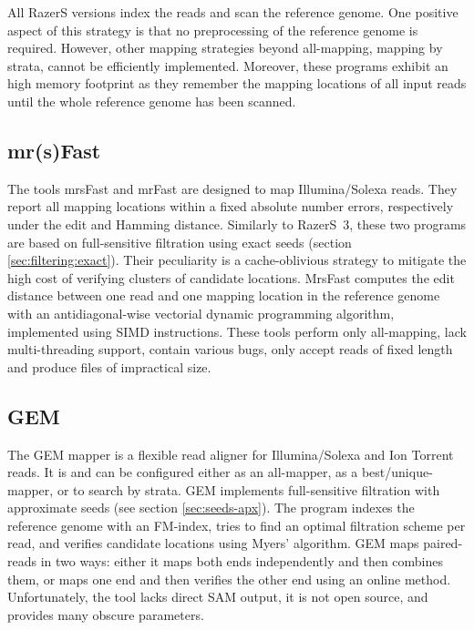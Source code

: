 All RazerS versions index the reads and scan the reference genome.
One positive aspect of this strategy is that no preprocessing of the reference genome is required.
However, other mapping strategies beyond all-mapping, \eg mapping by strata, cannot be efficiently implemented.
Moreover, these programs exhibit an high memory footprint as they remember the mapping locations of all input reads until the whole reference genome has been scanned.


\subsection{mr(s)Fast}
\label{background:mappers:mrsfast}

The tools mrsFast \citep{Hach2010} and mrFast \citep{Ahmadi2012} are designed to map Illumina/Solexa reads.
They report all mapping locations within a fixed absolute number errors, respectively under the edit and Hamming distance.
Similarly to RazerS~3, these two programs are based on full-sensitive filtration using exact seeds (section \ref{sec:filtering:exact}).
Their peculiarity is a cache-oblivious strategy to mitigate the high cost of verifying clusters of candidate locations.
MrsFast computes the edit distance between one read and one mapping location in the reference genome with an antidiagonal-wise vectorial dynamic programming algorithm, implemented using SIMD instructions.
These tools perform only all-mapping, lack multi-threading support, contain various bugs, only accept reads of fixed length and produce files of impractical size.


\subsection{GEM}
\label{background:mappers:gem}

The GEM mapper \citep{MarcoSola2012} is a flexible read aligner for Illumina/Solexa and Ion Torrent reads.
It is  and can be configured either as an all-mapper, as a best/unique-mapper, or to search by strata.
GEM implements full-sensitive filtration with approximate seeds (see section \ref{sec:seeds-apx}).
The program indexes the reference genome with an FM-index, tries to find an optimal filtration scheme per read, and verifies candidate locations using Myers' algorithm.
GEM maps paired-reads in two ways: either it maps both ends independently and then combines them, or maps one end and then verifies the other end using an online method.
Unfortunately, the tool lacks direct SAM output, it is not open source, and provides many obscure parameters.

